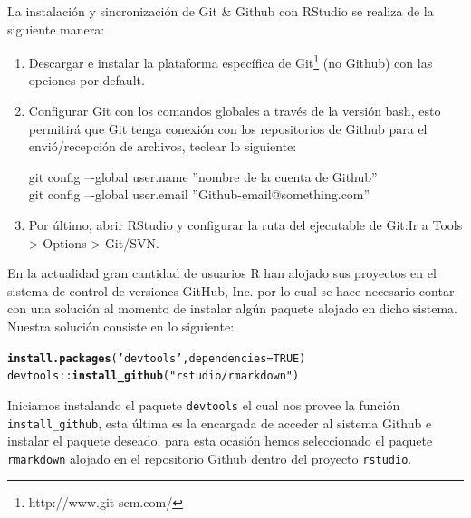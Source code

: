 \documentclass[11pt,a4paper,oneside]{book}\usepackage[]{graphicx}\usepackage[]{color}
\makeatletter
\newcommand{\hlnum}[1]{\textcolor[rgb]{0.686,0.059,0.569}{#1}}%
\newcommand{\hlstr}[1]{\textcolor[rgb]{0.192,0.494,0.8}{#1}}%
\newcommand{\hlopt}[1]{\textcolor[rgb]{0,0,0}{#1}}%
\newcommand{\hlstd}[1]{\textcolor[rgb]{0.345,0.345,0.345}{#1}}%
\newcommand{\hlkwc}[1]{\textcolor[rgb]{0.333,0.667,0.333}{#1}}%
\newcommand{\hlkwd}[1]{\textcolor[rgb]{0.737,0.353,0.396}{\textbf{#1}}}%
\newenvironment{kframe}{%
 \def\at@end@of@kframe{}%
 \ifinner\ifhmode%
  \def\at@end@of@kframe{\end{minipage}}%
  \begin{minipage}{\columnwidth}%
 \fi\fi%
 \def\FrameCommand##1{\hskip\@totalleftmargin \hskip-\fboxsep
 \colorbox{shadecolor}{##1}\hskip-\fboxsep
     \hskip-\linewidth \hskip-\@totalleftmargin \hskip\columnwidth}%
 \MakeFramed {\advance\hsize-\width
   \@totalleftmargin\z@ \linewidth\hsize
   \@setminipage}}%
 {\par\unskip\endMakeFramed%
 \at@end@of@kframe}
\newenvironment{knitrout}{}{} %
\makeatother
\begin{document}
\begin{itemize}
La instalación y sincronización de Git $\&$ Github con RStudio se realiza de la siguiente manera:
\begin{enumerate}
  \item Descargar e instalar la plataforma específica de Git\footnote{http://www.git-scm.com/} (no Github) con las opciones por default.
  \item Configurar Git con los comandos globales a través de la versión bash, esto permitirá que Git tenga conexión con los repositorios de Github para el envió/recepción de archivos, teclear lo siguiente:
  \begin{center}
  git config –-global user.name ''nombre de la cuenta de Github''\\
  git config –-global user.email ''Github-email@something.com''
  \end{center}
  \item Por último, abrir RStudio y configurar la ruta del ejecutable de Git:\newline Ir a Tools > Options > Git/SVN.
\end{enumerate}


En la actualidad gran cantidad de usuarios R han alojado sus proyectos en el sistema de control de versiones GitHub, Inc. por lo cual se hace necesario contar con una solución al momento de instalar algún paquete alojado en dicho sistema. Nuestra solución consiste en lo siguiente:
\begin{knitrout}
\color{fgcolor}\begin{kframe}
\begin{alltt}
\hlkwd{install.packages}\hlstd{(}\hlstr{'devtools'}\hlstd{,} \hlkwc{dependencies}\hlstd{=}\hlnum{TRUE}\hlstd{)}
\hlstd{devtools}\hlopt{::}\hlkwd{install_github}\hlstd{(}\hlstr{"rstudio/rmarkdown"}\hlstd{)}
\end{alltt}
\end{kframe}
\end{knitrout}
Iniciamos instalando el paquete \texttt{devtools} el cual nos provee la función \texttt{install\_github}, esta última es la encargada de acceder al sistema Github e instalar el paquete deseado, para esta ocasión hemos seleccionado el paquete \texttt{rmarkdown} alojado en el repositorio Github dentro del proyecto \texttt{rstudio}.\newline


\end{itemize}
\end{document}
